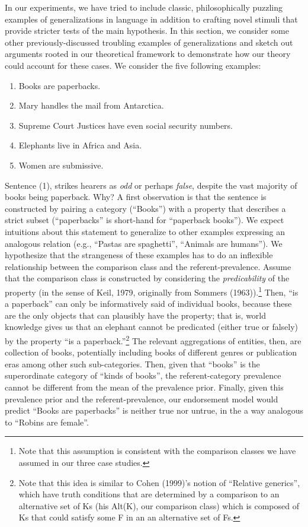 \documentclass[english,floatsintext,man]{apa6}
\providecommand{\tightlist}{%
  \setlength{\itemsep}{0pt}\setlength{\parskip}{0pt}}
\theoremstyle{definition}
\theoremstyle{definition}
\theoremstyle{definition}
\theoremstyle{remark}
\begin{document}
In our experiments, we have tried to include classic, philosophically
puzzling examples of generalizations in language in addition to crafting
novel stimuli that provide stricter tests of the main hypothesis. In
this section, we consider some other previously-discussed troubling
examples of generalizations and sketch out arguments rooted in our
theoretical framework to demonstrate how our theory could account for
these cases. We consider the five following examples:

\begin{enumerate}
\def\labelenumi{\arabic{enumi}.}
\tightlist
\item
  Books are paperbacks.
\item
  Mary handles the mail from Antarctica.
\item
  Supreme Court Justices have even social security numbers.
\item
  Elephants live in Africa and Asia.
\item
  Women are submissive.
\end{enumerate}

Sentence (1), strikes hearers as \emph{odd} or perhaps \emph{false},
despite the vast majority of books being paperback. Why? A first
observation is that the sentence is constructed by pairing a category
(\enquote{Books}) with a property that describes a strict subset
(\enquote{paperbacks} is short-hand for \enquote{paperback books}). We
expect intuitions about this statement to generalize to other examples
expressing an analogous relation (e.g., \enquote{Pastas are spaghetti},
\enquote{Animals are humans}). We hypothesize that the strangeness of
these examples has to do an inflexible relationship between the
comparison class and the referent-prevalence. Assume that the comparison
class is constructed by considering the \emph{predicability} of the
property (in the sense of Keil, 1979, originally from Sommers
(1963)).\footnote{Note that this assumption is consistent with the
  comparison classes we have assumed in our three case studies.} Then,
\enquote{is a paperback} can only be informatively said of individual
books, because these are the only objects that can plausibly have the
property; that is, world knowledge gives us that an elephant cannot be
predicated (either true or falsely) by the property \enquote{is a
paperback.}\footnote{Note that this idea is similar to Cohen (1999)'s
  notion of \enquote{Relative generics}, which have truth conditions
  that are determined by a comparison to an alternative set of Ks (his
  Alt(K), our comparison class) which is composed of Ks that could
  satisfy some F in an an alternative set of Fs.} The relevant
aggregations of entities, then, are collection of books, potentially
including books of different genres or publication eras among other such
sub-categories. Then, given that \enquote{books} is the superordinate
category of \enquote{kinds of books}, the referent-category prevalence
cannot be different from the mean of the prevalence prior. Finally,
given this prevalence prior and the referent-prevalence, our endorsement
model would predict \enquote{Books are paperbacks} is neither true nor
untrue, in the a way analogous to \enquote{Robins are female}.
\end{document}
